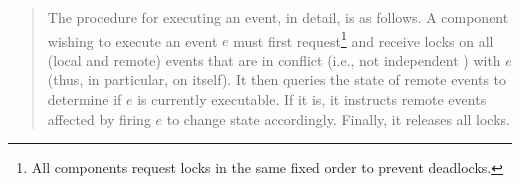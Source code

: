 	\begin{quotation}
		The procedure for executing an event, in detail, is as follows. A component
		wishing to execute an event $e$ must first request\footnote{All components request locks in the same fixed order to prevent deadlocks.} and receive locks on all (local
		and remote) events that are in conflict (i.e., not independent ) with $e$ (thus, in
		particular, on itself). It then queries the state of remote events to determine if
		$e$ is currently executable. If it is, it instructs remote events affected by firing $e$
		to change state accordingly. Finally, it releases all locks.
	\end{quotation}
	
	
	
	
	
	
